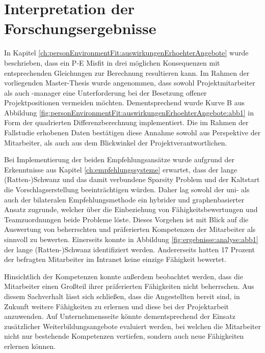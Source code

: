 \section{Interpretation der Forschungsergebnisse}
\label{ch:diskussion:interpretation}
In Kapitel \ref{ch:personEnvironmentFit:auswirkungenErhoehterAngebote} wurde beschrieben, dass ein P-E Misfit in drei möglichen Konsequenzen mit entsprechenden Gleichungen zur Berechnung resultieren kann. Im Rahmen der vorliegenden Master-Thesis wurde angenommen, dass sowohl Projektmitarbeiter als auch -manager eine Unterforderung bei der Besetzung offener Projektpositionen vermeiden möchten. Dementsprechend wurde Kurve B aus Abbildung \ref{fig:personEnvironmentFit:auswirkungenErhoehterAngebote:abb1} in Form der quadrierten Differenzberechnung implementiert. Die im Rahmen der Fallstudie erhobenen Daten bestätigen diese Annahme sowohl aus Perspektive der Mitarbeiter, als auch aus dem Blickwinkel der Projektverantwortlichen. 

Bei Implementierung der beiden Empfehlungsansätze wurde aufgrund der Erkenntnisse aus Kapitel \ref{ch:empfehlungssysteme} erwartet, dass der lange (Ratten-)Schwanz und das damit verbundene Sparsity Problem und der Kaltstart die Vorschlagserstellung beeinträchtigen würden. Daher lag sowohl der uni- als auch der bilateralen Empfehlungsmethode ein hybrider und graphenbasierter Ansatz zugrunde, welcher über die Einbeziehung von Fähigkeitsbewertungen und Teamzuordnungen beide Probleme löste. Dieses Vorgehen ist mit Blick auf die Auswertung von beherrschten und präferierten Kompetenzen der Mitarbeiter als sinnvoll zu bewerten. Einerseits konnte in Abbildung \ref{fig:ergebnisse:analyse:abb1} der lange (Ratten-)Schwanz identifiziert werden. Andererseits hatten 17 Prozent der befragten Mitarbeiter im Intranet keine einzige Fähigkeit bewertet.%

Hinsichtlich der Kompetenzen konnte außerdem beobachtet werden, dass die Mitarbeiter einen Großteil ihrer präferierten Fähigkeiten nicht beherrschen. Aus diesem Sachverhalt lässt sich schließen, dass die Angestellten bereit sind, in Zukunft weitere Fähigkeiten zu erlernen und diese bei der Projektarbeit anzuwenden. Auf Unternehmensseite könnte dementsprechend der Einsatz zusätzlicher Weiterbildungsangebote evaluiert werden, bei welchen die Mitarbeiter nicht nur bestehende Kompetenzen vertiefen, sondern auch neue Fähigkeiten erlernen können.

